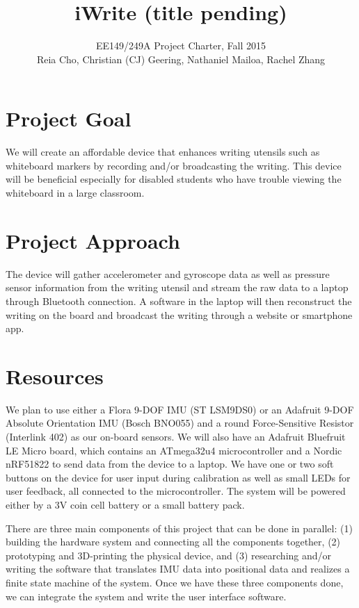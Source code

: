 \documentclass[12pt,journal]{IEEEtran}
\begin{document}
\title{iWrite (title pending)}

\author{EE149/249A Project Charter, Fall 2015

Reia Cho, Christian (CJ) Geering, Nathaniel Mailoa, Rachel Zhang}


\maketitle

\section{Project Goal}
We will create an affordable device that enhances writing utensils such as whiteboard markers by recording and/or broadcasting the writing. This device will be beneficial especially for disabled students who have trouble viewing the whiteboard in a large classroom.


\section{Project Approach}
The device will gather accelerometer and gyroscope data as well as pressure sensor information from the writing utensil and stream the raw data to a laptop through Bluetooth connection. A software in the laptop will then reconstruct the writing on the board and broadcast the writing through a website or smartphone app.


\section{Resources}
We plan to use either a Flora 9-DOF IMU (ST LSM9DS0) or an Adafruit 9-DOF Absolute Orientation IMU (Bosch BNO055) and a round Force-Sensitive Resistor (Interlink 402) as our on-board sensors. We will also have an Adafruit Bluefruit LE Micro board, which contains an ATmega32u4 microcontroller and a Nordic nRF51822 to send data from the device to a laptop. We have one or two soft buttons on the device for user input during calibration as well as small LEDs for user feedback, all connected to the microcontroller. The system will be powered either by a 3V coin cell battery or a small battery pack.


There are three main components of this project that can be done in parallel: (1) building the hardware system and connecting all the components together, (2) prototyping and 3D-printing the physical device, and (3) researching and/or writing the software that translates IMU data into positional data and realizes a finite state machine of the system. Once we have these three components done, we can integrate the system and write the user interface software.
\end{document}
